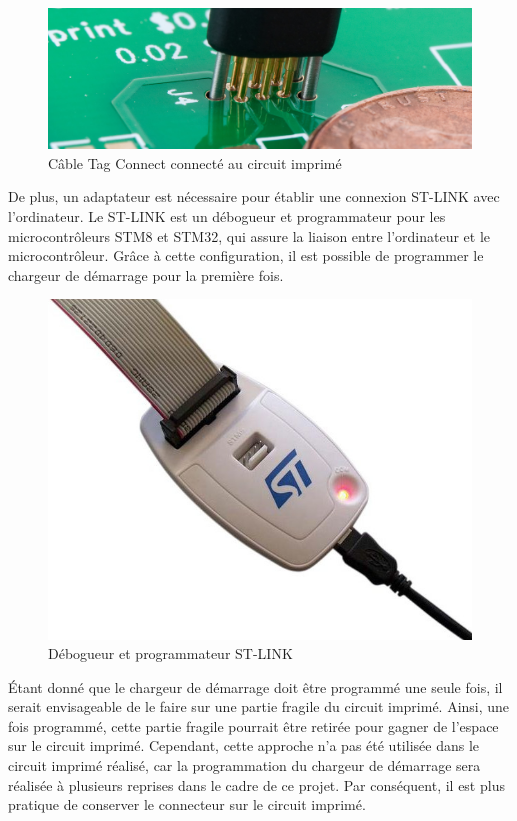 \begin{figure}[H]
    \centering
    \includegraphics[scale=0.2]{./assets/figures/tag_connect_pcb.jpg}
    \caption{\cite{tag_connect_pcb} Câble Tag Connect connecté au circuit imprimé}
\end{figure}

De plus, un adaptateur est nécessaire pour établir une connexion ST-LINK avec l'ordinateur.
Le ST-LINK est un débogueur et programmateur pour les microcontrôleurs STM8 et STM32, qui assure la liaison entre l'ordinateur et le microcontrôleur.
Grâce à cette configuration, il est possible de programmer le chargeur de démarrage pour la première fois.

\begin{figure}[H]
    \centering
    \includegraphics[scale=0.3]{./assets/figures/st_link.jpg}
    \caption{\cite{st_link} Débogueur et programmateur ST-LINK}
\end{figure}

Étant donné que le chargeur de démarrage doit être programmé une seule fois, il serait envisageable de le faire sur une partie fragile du circuit imprimé.
Ainsi, une fois programmé, cette partie fragile pourrait être retirée pour gagner de l'espace sur le circuit imprimé.
Cependant, cette approche n'a pas été utilisée dans le circuit imprimé réalisé, car la programmation du chargeur de démarrage sera réalisée à plusieurs reprises dans le cadre de ce projet.
Par conséquent, il est plus pratique de conserver le connecteur sur le circuit imprimé.

